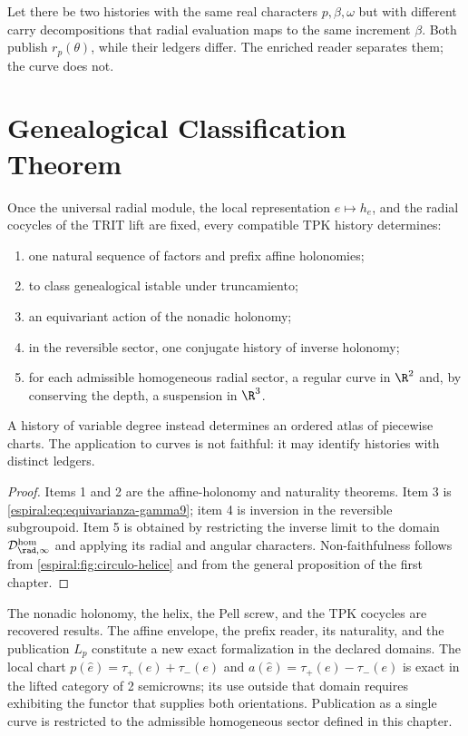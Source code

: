\begin{example}
Let there be two histories with the same real characters \(p,\beta,\omega\)
but with different carry decompositions that radial evaluation maps
to the same increment \(\beta\). Both publish \(r_p(\theta)\), while their
ledgers differ. The enriched reader separates them; the curve does not.
\end{example}

\section{Genealogical Classification Theorem}

\begin{theorem}
Once the universal radial module, the local representation
\(e\mapsto h_e\), and the radial cocycles of the TRIT lift are fixed, every
compatible TPK history determines:
\begin{enumerate}
\item one natural sequence of factors and prefix affine holonomies;
\item to class genealogical istable under truncamiento;
\item an equivariant action of the nonadic holonomy;
\item in the reversible sector, one conjugate history of inverse holonomy;
\item for each admissible homogeneous radial sector, a regular curve in
\(\R^2\) and, by conserving the depth, a suspension in \(\R^3\).
\end{enumerate}
A history of variable degree instead determines an ordered atlas of
piecewise charts. The application to curves is not faithful: it may identify
histories with distinct ledgers.
\end{theorem}
\begin{proof}
Items 1 and 2 are the affine-holonomy and naturality theorems. Item
3 is \cref{espiral:eq:equivarianza-gamma9}; item 4 is inversion in the
reversible subgroupoid. Item 5 is obtained by restricting the inverse
limit to the domain \(\mathcal D_{\rad,\infty}^{\mathrm{hom}}\) and applying its
radial and angular characters. Non-faithfulness follows from
\cref{espiral:fig:circulo-helice} and from the general proposition of the first chapter.
\end{proof}

\begin{statusbox}[title={Hypotheses, domain, and scope of the theorem}]
The nonadic holonomy, the helix, the Pell screw, and the TPK cocycles
are recovered results. The affine envelope, the prefix reader, its
naturality, and the publication \(L_p\) constitute a new exact
formalization in the declared domains. The local chart
\(p(\widehat e)=\tau_+(e)+\tau_-(e)\) and
\(a(\widehat e)=\tau_+(e)-\tau_-(e)\) is exact in the lifted category
of 2 semicrowns; its use outside that domain requires exhibiting the functor that
supplies both orientations. Publication as a single curve is restricted
to the admissible homogeneous sector defined in this chapter.
\end{statusbox}

